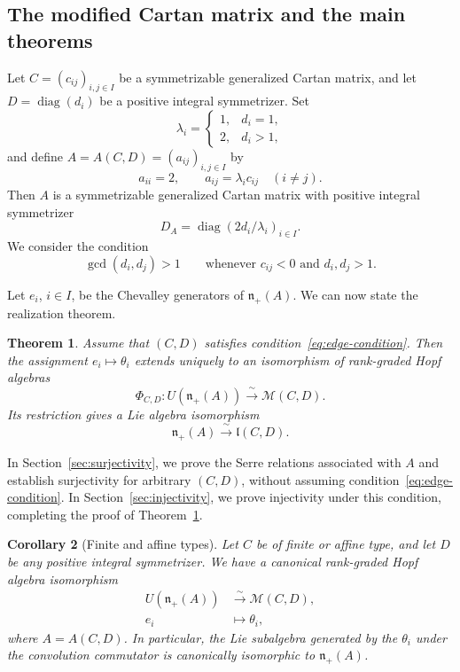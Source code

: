 \documentclass[12pt,reqno]{amsart}
\numberwithin{equation}{section}
\newtheorem{theorem}{Theorem}[section]
\newtheorem{corollary}[theorem]{Corollary}
\theoremstyle{definition}
\theoremstyle{remark}
\newcommand{\diag}{\operatorname{diag}}
\theoremstyle{plain}
\theoremstyle{plain}
\begin{document}
\subsection{The modified Cartan matrix and the main theorems}
\label{subsec:main-theorem}
Let $C=(c_{ij})_{i,j\in I}$ be a symmetrizable generalized Cartan matrix, and let $D=\operatorname{diag}(d_i)$ be a positive integral symmetrizer. Set
\[
    \lambda_i=
    \begin{cases}
        1, & d_i=1,\\
        2, & d_i>1,
    \end{cases}
\]
and define $A=A(C,D)=(a_{ij})_{i,j\in I}$ by
\begin{equation}\label{eq:modified-cartan}
    a_{ii}=2,\qquad
    a_{ij}=\lambda_i c_{ij}\quad(i\ne j).
\end{equation}
Then $A$ is a symmetrizable generalized Cartan matrix
with positive integral symmetrizer
\[
    D_A=\diag(2d_i/\lambda_i)_{i\in I}.
\]
We consider the condition
\begin{equation}\tag{E}\label{eq:edge-condition}
    \gcd(d_i,d_j)>1
    \qquad\text{whenever }c_{ij}<0
    \text{ and }d_i,d_j>1.
\end{equation}

Let $e_i$, $i\in I$, be the Chevalley generators of $\mathfrak n_+(A)$. We can now state the realization theorem.

\begin{theorem}\label{thm:main}
Assume that $(C,D)$ satisfies
condition~\eqref{eq:edge-condition}.
Then the assignment $e_i\mapsto\theta_i$ extends uniquely
to an isomorphism of rank-graded Hopf algebras
\[
    \Phi_{C,D}\colon
    U(\mathfrak n_+(A))
    \xrightarrow{\;\sim\;}
    \mathcal M(C,D).
\]
Its restriction gives a Lie algebra isomorphism
\[
    \mathfrak n_+(A)\xrightarrow{\;\sim\;} \mathfrak l(C,D).
\]
\end{theorem}

In Section~\ref{sec:surjectivity}, we prove the Serre relations associated with $A$ and establish surjectivity for arbitrary $(C,D)$, without assuming condition~\eqref{eq:edge-condition}. In Section~\ref{sec:injectivity}, we prove injectivity under this condition, completing the proof of Theorem~\ref{thm:main}.

\begin{corollary}[Finite and affine types] \label{cor:finite-affine}
Let $C$ be of finite or affine type, and let $D$ be any positive integral symmetrizer.  We have a canonical rank-graded Hopf algebra isomorphism
\[
\begin{aligned}
    U(\mathfrak n_+(A)) &\xrightarrow{\sim} \mathcal M(C,D),\\
    e_i &\longmapsto \theta_i,
\end{aligned}
\]
where $A=A(C,D)$. In particular, the Lie subalgebra generated by the $\theta_i$ under the convolution commutator is canonically isomorphic to $\mathfrak n_+(A)$.
\end{corollary}
\end{document}
